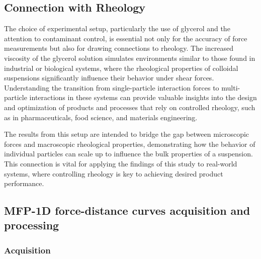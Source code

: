 \subsection{Connection with Rheology}

The choice of experimental setup, particularly the use of glycerol and the attention to contaminant control, is essential not only for the accuracy of force measurements but also for drawing connections to rheology. The increased viscosity of the glycerol solution simulates environments similar to those found in industrial or biological systems, where the rheological properties of colloidal suspensions significantly influence their behavior under shear forces. Understanding the transition from single-particle interaction forces to multi-particle interactions in these systems can provide valuable insights into the design and optimization of products and processes that rely on controlled rheology, such as in pharmaceuticals, food science, and materials engineering.

The results from this setup are intended to bridge the gap between microscopic forces and macroscopic rheological properties, demonstrating how the behavior of individual particles can scale up to influence the bulk properties of a suspension. This connection is vital for applying the findings of this study to real-world systems, where controlling rheology is key to achieving desired product performance.
%



\subsection{MFP-1D force-distance curves acquisition and processing}

\subsubsection{Acquisition}

